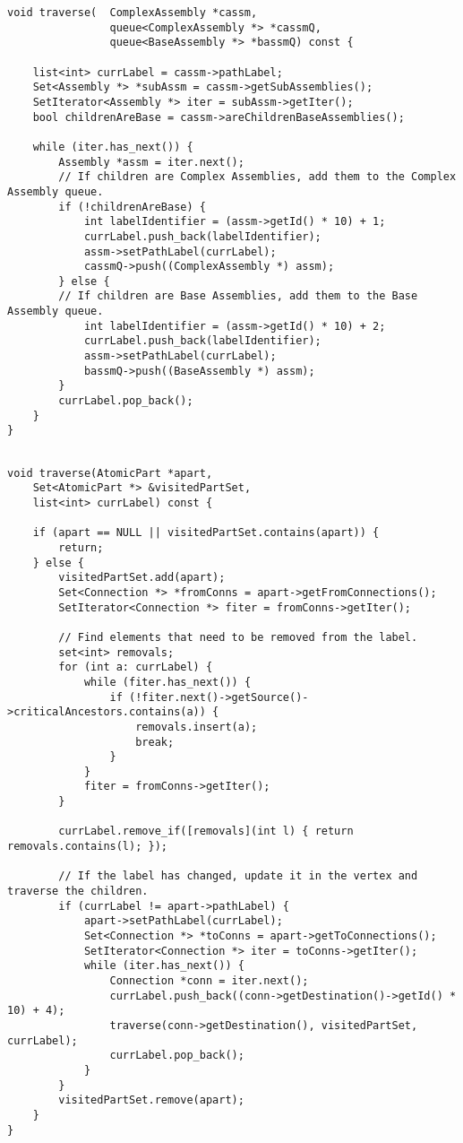 \begin{lstlisting}[caption={Labelling a complex assembly},label={lst:traverseCA}]
void traverse(  ComplexAssembly *cassm, 
                queue<ComplexAssembly *> *cassmQ, 
                queue<BaseAssembly *> *bassmQ) const {

    list<int> currLabel = cassm->pathLabel;
    Set<Assembly *> *subAssm = cassm->getSubAssemblies();
    SetIterator<Assembly *> iter = subAssm->getIter();
    bool childrenAreBase = cassm->areChildrenBaseAssemblies();

    while (iter.has_next()) {
        Assembly *assm = iter.next();
        // If children are Complex Assemblies, add them to the Complex Assembly queue.
        if (!childrenAreBase) {
            int labelIdentifier = (assm->getId() * 10) + 1;
            currLabel.push_back(labelIdentifier);
            assm->setPathLabel(currLabel);
            cassmQ->push((ComplexAssembly *) assm);
        } else {
        // If children are Base Assemblies, add them to the Base Assembly queue.
            int labelIdentifier = (assm->getId() * 10) + 2;
            currLabel.push_back(labelIdentifier);
            assm->setPathLabel(currLabel);
            bassmQ->push((BaseAssembly *) assm);
        }
        currLabel.pop_back();
    }
}


\end{lstlisting}



\begin{lstlisting}[caption={Labelling an atomic part},label={lst:traverseAP}]
void traverse(AtomicPart *apart, 
    Set<AtomicPart *> &visitedPartSet, 
    list<int> currLabel) const {

    if (apart == NULL || visitedPartSet.contains(apart)) {
        return;
    } else {
        visitedPartSet.add(apart);
        Set<Connection *> *fromConns = apart->getFromConnections();
        SetIterator<Connection *> fiter = fromConns->getIter();

        // Find elements that need to be removed from the label.
        set<int> removals;
        for (int a: currLabel) {
            while (fiter.has_next()) {
                if (!fiter.next()->getSource()->criticalAncestors.contains(a)) {
                    removals.insert(a);
                    break;
                }
            }
            fiter = fromConns->getIter();
        }

        currLabel.remove_if([removals](int l) { return removals.contains(l); });

        // If the label has changed, update it in the vertex and traverse the children.
        if (currLabel != apart->pathLabel) {
            apart->setPathLabel(currLabel);
            Set<Connection *> *toConns = apart->getToConnections();
            SetIterator<Connection *> iter = toConns->getIter();
            while (iter.has_next()) {
                Connection *conn = iter.next();
                currLabel.push_back((conn->getDestination()->getId() * 10) + 4);
                traverse(conn->getDestination(), visitedPartSet, currLabel);
                currLabel.pop_back();
            }
        }
        visitedPartSet.remove(apart);
    }
}
\end{lstlisting}


